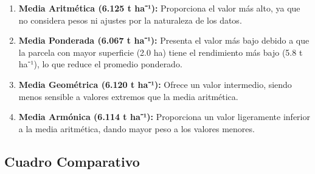 \documentclass[
  spanish,
  letterpaper,
]{book}
\begin{document}
\begin{enumerate}
\def\labelenumi{\arabic{enumi}.}
\item
  \textbf{Media Aritmética (6.125 t ha⁻¹):} Proporciona el valor más
  alto, ya que no considera pesos ni ajustes por la naturaleza de los
  datos.
\item
  \textbf{Media Ponderada (6.067 t ha⁻¹):} Presenta el valor más bajo
  debido a que la parcela con mayor superficie (2.0 ha) tiene el
  rendimiento más bajo (5.8 t ha⁻¹), lo que reduce el promedio
  ponderado.
\item
  \textbf{Media Geométrica (6.120 t ha⁻¹):} Ofrece un valor intermedio,
  siendo menos sensible a valores extremos que la media aritmética.
\item
  \textbf{Media Armónica (6.114 t ha⁻¹):} Proporciona un valor
  ligeramente inferior a la media aritmética, dando mayor peso a los
  valores menores.
\end{enumerate}

\subsection{Cuadro Comparativo}\label{cuadro-comparativo}
\end{document}
